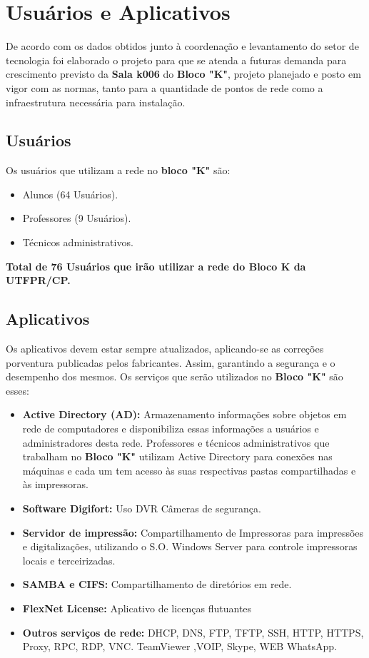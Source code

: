 \documentclass[	DIV=calc,%
paper=a4,%
fontsize=12pt,%
onecolumn]{scrartcl}	 					%
\begin{document}
	\section{Usuários e Aplicativos}
	De acordo com os dados obtidos junto à coordenação e levantamento do setor de tecnologia foi elaborado o projeto para que se atenda a futuras demanda para crescimento previsto da \textbf{Sala k006} do \textbf{Bloco "K"}, projeto planejado e posto em vigor com as normas, tanto para a quantidade de pontos de rede como a infraestrutura necessária para instalação.
	\subsection{Usuários}
	Os usuários que utilizam a rede no \textbf{bloco "K"} são:
	\begin{itemize}
		\item Alunos (64 Usuários).
		\item Professores (9 Usuários).
		\item Técnicos administrativos.
	\end{itemize}
	\textbf{Total de 76 Usuários que irão utilizar a rede do Bloco K da UTFPR/CP.}
	
	\subsection{Aplicativos}
	Os aplicativos devem estar sempre atualizados, aplicando-se as correções porventura publicadas pelos fabricantes. Assim, garantindo a segurança e o desempenho dos mesmos.
	Os serviços que serão utilizados no \textbf{Bloco "K"} são esses: 
	\begin{itemize}
		\item \textbf{Active Directory (AD):} Armazenamento informações sobre objetos em rede de computadores e disponibiliza essas informações a usuários e administradores desta rede. Professores e  técnicos administrativos que trabalham no \textbf{Bloco "K"} utilizam Active Directory para conexões nas máquinas e cada um tem acesso às suas respectivas pastas compartilhadas e às impressoras.
		\item \textbf{Software Digifort:} Uso DVR Câmeras de segurança.
		\item \textbf{Servidor de impressão:} Compartilhamento de Impressoras para impressões e digitalizações, utilizando o S.O. Windows Server para controle impressoras locais e terceirizadas.
		\item \textbf{SAMBA e CIFS:} Compartilhamento de diretórios em rede.
		\item \textbf{FlexNet License:} Aplicativo de licenças flutuantes
		\item \textbf{Outros serviços de rede:} DHCP, DNS, FTP, TFTP, SSH, HTTP, HTTPS, Proxy, RPC, RDP, VNC. TeamViewer ,VOIP, Skype,  WEB WhatsApp.
	\end{itemize}
	
\end{document}

